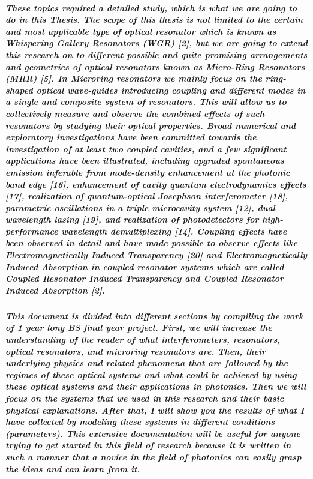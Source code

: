 \subparagraph{\normalfont \large These topics required a detailed study, which is what we are going to do in this Thesis. The scope of this thesis is not limited to the certain and most applicable type of optical resonator which is known as Whispering Gallery Resonators (WGR) [2], but we are going to extend this research on to different possible and quite promising arrangements and geometries of optical resonators known as Micro-Ring Resonators (MRR) [5]. In Microring resonators we mainly focus on the ring-shaped optical wave-guides introducing coupling and different modes in a single and composite system of resonators. This will allow us to collectively measure and observe the combined effects of such resonators by studying their optical properties. Broad numerical and exploratory investigations have been committed towards the investigation of at least two coupled cavities, and a few significant applications have been illustrated, including upgraded spontaneous emission inferable from mode-density enhancement at the photonic band edge [16], enhancement of cavity quantum electrodynamics effects [17], realization of
quantum-optical Josephson interferometer [18], parametric oscillations in a triple microcavity
system [12], dual wavelength lasing [19], and realization of photodetectors for high-performance wavelength demultiplexing [14]. Coupling effects have been observed in detail and have made possible to observe effects like Electromagnetically Induced Transparency [20] and Electromagnetically Induced Absorption in coupled resonator systems which are called Coupled Resonator Induced Transparency and Coupled Resonator Induced Absorption [2].}
\subparagraph{\normalfont \large This document is divided into different sections by compiling the work of 1 year long BS final year project. First, we will increase the understanding of the reader of what interferometers, resonators, optical resonators, and microring resonators are. Then, their underlying physics and related phenomena that are followed by the regimes of these optical systems and what could be achieved by using these optical systems and their applications in photonics. Then we will focus on the systems that we used in this research and their basic physical explanations. After that, I will show you the results of what I have collected by modeling these systems in different conditions (parameters). This extensive documentation will be useful for anyone trying to get started in this field of research because it is written in such a manner that a novice in the field of photonics can easily grasp the ideas and can learn from it. }

